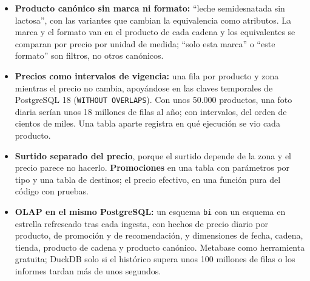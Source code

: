\begin{tcolorbox}[colback=responsecolor, title=Insights de Claude, colframe=gray!60!black, breakable]
	\begin{itemize}
		\item \textbf{Producto canónico sin marca ni formato:} ``leche semidesnatada sin lactosa'', con las variantes que cambian la equivalencia como atributos. La marca y el formato van en el producto de cada cadena y los equivalentes se comparan por precio por unidad de medida; ``solo esta marca'' o ``este formato'' son filtros, no otros canónicos.

		\item \textbf{Precios como intervalos de vigencia:} una fila por producto y zona mientras el precio no cambia, apoyándose en las claves temporales de PostgreSQL 18 (\texttt{WITHOUT OVERLAPS}). Con unos 50.000 productos, una foto diaria serían unos 18 millones de filas al año; con intervalos, del orden de cientos de miles. Una tabla aparte registra en qué ejecución se vio cada producto.

		\item \textbf{Surtido separado del precio}, porque el surtido depende de la zona y el precio parece no hacerlo. \textbf{Promociones} en una tabla con parámetros por tipo y una tabla de destinos; el precio efectivo, en una función pura del código con pruebas.

		\item \textbf{OLAP en el mismo PostgreSQL:} un esquema \texttt{bi} con un esquema en estrella refrescado tras cada ingesta, con hechos de precio diario por producto, de promoción y de recomendación, y dimensiones de fecha, cadena, tienda, producto de cadena y producto canónico. Metabase como herramienta gratuita; DuckDB solo si el histórico supera unos 100 millones de filas o los informes tardan más de unos segundos.
	\end{itemize}
\end{tcolorbox}

